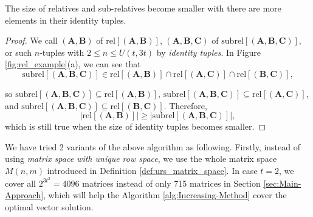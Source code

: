 \begin{thm}
The size of relatives and sub-relatives become smaller with there
are more elements in their identity tuples. \label{theo:size_rel}
\end{thm}
\begin{proof}
We call $\left(\boldsymbol{A},\boldsymbol{B}\right)$ of $\mathrm{rel}\left[\left(\boldsymbol{A},\boldsymbol{B}\right)\right]$,
$\left(\boldsymbol{A},\boldsymbol{B},\boldsymbol{C}\right)$ of $\mathrm{subrel}\left[\left(\boldsymbol{A},\boldsymbol{B},\boldsymbol{C}\right)\right]$,
or such $n$-tuples with $2\leq n\leq U\left(t,3t\right)$ by \textit{identity
tuples}. In Figure \ref{fig:rel_example}(a), we can see that 
\[
\mathrm{subrel}\left[\left(\boldsymbol{A},\boldsymbol{B},\boldsymbol{C}\right)\right]\in\mathrm{rel}\left[\left(\boldsymbol{A},\boldsymbol{B}\right)\right]\cap\mathrm{rel}\left[\left(\boldsymbol{A},\boldsymbol{C}\right)\right]\cap\mathrm{rel}\left[\left(\boldsymbol{B},\boldsymbol{C}\right)\right],
\]

so $\mathrm{subrel}\left[\left(\boldsymbol{A},\boldsymbol{B},\boldsymbol{C}\right)\right]\subseteq\mathrm{rel}\left[\left(\boldsymbol{A},\boldsymbol{B}\right)\right]$,
$\mathrm{subrel}\left[\left(\boldsymbol{A},\boldsymbol{B},\boldsymbol{C}\right)\right]\subseteq\mathrm{rel}\left[\left(\boldsymbol{A},\boldsymbol{C}\right)\right]$,
and $\mathrm{subrel}\left[\left(\boldsymbol{A},\boldsymbol{B},\boldsymbol{C}\right)\right]\subseteq\mathrm{rel}\left[\left(\boldsymbol{B},\boldsymbol{C}\right)\right]$.
Therefore,
\[
\left|\mathrm{rel}\left[\left(\boldsymbol{A},\boldsymbol{B}\right)\right]\right|\geq\left|\mathrm{subrel}\left[\left(\boldsymbol{A},\boldsymbol{B},\boldsymbol{C}\right)\right]\right|,
\]
which is still true when the size of identity tuples becomes smaller.
\end{proof}
We have tried 2 variants of the above algorithm as following. Firstly,
instead of using \textit{matrix space with unique row space}, we use
the whole matrix space $M\left(n,m\right)$ introduced in Definition
\ref{def:urs_matrix_space}. In case $t=2$, we cover all $2^{3t^{2}}=4096$
matrices instead of only 715 matrices in Section \ref{sec:Main-Approach},
which will help the Algorithm \ref{alg:Increasing-Method} cover the
optimal vector solution.
